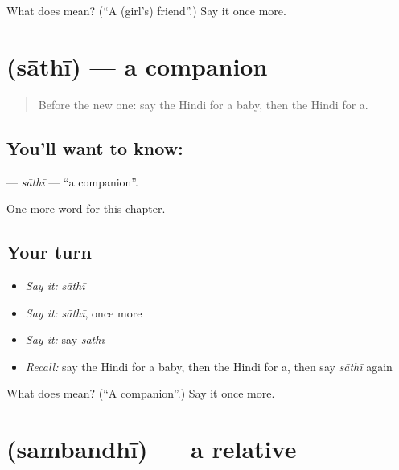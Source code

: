 \begin{tcolorbox}[breakable,colback=teal!4,colframe=teal!35!black,title={Before you move on}]
What does  mean? (\textquotedblleft{}A (girl's) friend\textquotedblright{}.) Say it once more.
\end{tcolorbox}
\section[\texorpdfstring{\hi{साथी} (sāthī)}{साथी (sāthī)}]{ (sāthī) — a companion}

\label{lesson:HI-C254-sathi}



\begin{quote}
Before the new one: say the Hindi for a baby, then the Hindi for a.
\end{quote}

\subsection*{You'll want to know: }
\textbf{} — \emph{sāthī} — \textquotedblleft{}a companion\textquotedblright{}.

\begin{grammarlens}[title={What you've built}]
One more word for this chapter.
\end{grammarlens}

\subsection*{Your turn}
\begin{itemize}
\raggedright
  \item \emph{Say it:} \emph{sāthī}
  \item \emph{Say it:} \emph{sāthī}, once more
  \item \emph{Say it:} say \emph{sāthī}
  \item \emph{Recall:} say the Hindi for a baby, then the Hindi for a, then say \emph{sāthī} again
\end{itemize}

\begin{tcolorbox}[breakable,colback=teal!4,colframe=teal!35!black,title={Before you move on}]
What does  mean? (\textquotedblleft{}A companion\textquotedblright{}.) Say it once more.
\end{tcolorbox}
\section[\texorpdfstring{\hi{संबंधी} (sambandhī)}{संबंधी (sambandhī)}]{ (sambandhī) — a relative}

